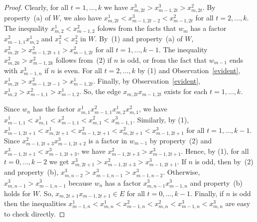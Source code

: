 \documentclass[11pt]{article}
\newtheorem{lemma}[theorem]{Lemma}
\begin{document}
\begin{proof}
Clearly, for all  $t=1,\ldots,k$ we have $x_{m,2t}^3>x_{m-1,2t}^3>x_{m,2t}^2$.  By property~(a) of \( W \), we also have \( x_{m,2t}^1 < x_{m-1,2t-2}^3 < x_{m-1,2t}^2 \) for all \( t = 2, \ldots, k \). The inequality $x_{m,2}^1<x_{m-1,2}^2$ folows from the facts that $w_m$ has a factor $x_{m-1,1}^2x_{m,2}^1$ and $x_1^2<x_2^2$ in $W$.
By~(1) and property~(a) of $W$, $x_{m,2t}^2>x_{m-1,2t+1}^2>x_{m-1,2t}^2$ for all $t=1,\ldots,k-1$. The inequality $x_{m,2k}^2>x_{m-1,2k}^2$ follows from~(2) if $n$ is odd, or from the fact that $w_{m-1}$ ends with $x_{m-1,n}^3$ if $n$ is even.
For all $t=2,\ldots,k$ by (1) and Observation~\ref{evident}, $x_{m,2t}^1>x_{m-1,2t-1}^2>x_{m-1,2t}^1$. Finally, by  Observation~\ref{evident}, $x_{m,2}^1>x_{m-1,1}^2>x_{m-1,2}^1$. So, the edge $x_{m,2t}x_{m-1,2t}$ exists for each  $t=1,\ldots,k$.

Since $w_n$ has the factor  $x_{m,1}^1x_{m-1,1}^2x_{m,2}^1x_{m,1}^2$, we have $x_{m-1,1}^1<x_{m,1}^1<x_{m-1,1}^2<x_{m,1}^2<x_{m-1,1}^3$.
Similarly, by (1), $x_{m-1,2t+1}^1<x_{m,2t+1}^1<x_{m-1,2t+1}^2<x_{m,2t+1}^2<x_{m-1,2t+1}^3$ for all $t=1,\ldots,k-1$. Since $x_{m-1,2t+3}^2x_{m-1,2t+2}^3$ is a factor in $w_{m-1}$ by property~(2) and 
$x_{m-1,2t+1}^3<x_{m-1,2t+3}^3$, we have $x_{m-1,2t+3}^2>x_{m-1,2t+1}^3$. Hence, by (1), for all $t=0,\ldots,k-2$ we get $x_{m,2t+1}^3>x_{m-1,2t+3}^2>x_{m-1,2t+1}^3$.
If $n$ is odd, then by~(2) and property~(b), $x_{m,n-2}^3> x_{m-1,n-1}^3>x_{m-1,n-2}^3$. Otherwise, $x_{m,n-1}^3>x_{m-1,n-1}^3$ because $w_n$ has a factor 
$x_{m,n-1}^3x_{m-1,n}^3$ and property~(b) holds for $W$. So, $x_{m,2t+1}x_{m-1,2t+1} \in E$ for all $t=0,\ldots,k-1$. Finally, if $n$ is odd then the inequalities
$x_{m-1,n}^1<x_{m,n}^1<x_{m-1,n}^2<x_{m,n}^2<x_{m-1,n}^3<x_{m,n}^3$ are easy to check directly.
\end{proof}



\end{document}
